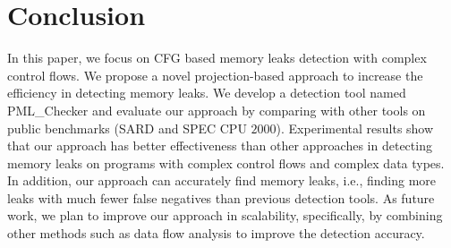 \section{Conclusion}\label{sec:conclusion}

In this paper, we focus on CFG based memory leaks detection with complex control flows. We propose a novel projection-based approach to increase the efficiency in detecting memory leaks. We develop a detection tool named PML\_Checker and evaluate our approach by comparing with other tools on public benchmarks (SARD and SPEC CPU $2000$). Experimental results show that our approach has better effectiveness than other approaches in detecting memory leaks on programs with complex control flows and complex data types. In addition, our approach can accurately find memory leaks, i.e., finding more leaks with much fewer false negatives than previous detection tools. As future work, we plan to improve our approach in scalability, specifically, by combining other methods such as data flow analysis to improve the detection accuracy.
